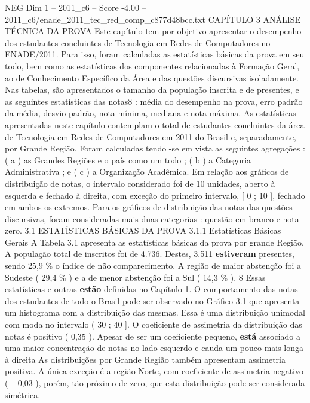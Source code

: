 \begin{textsample}{NEG Dim 1 – 2011\_c6 – Score -4.00 – 2011\_c6/enade\_2011\_tec\_red\_comp\_c877d48bcc.txt}  \label{ex:f1_neg_226}
CAPÍTULO 3 ANÁLISE TÉCNICA DA PROVA Este capítulo tem por objetivo apresentar o desempenho dos estudantes concluintes de Tecnologia em Redes de Computadores no ENADE/2011.
Para isso, foram calculadas as estatísticas básicas da prova em seu todo, bem como as estatísticas dos componentes relacionadas à Formação Geral, ao de Conhecimento Específico da Área e das questões discursivas isoladamente.
Nas tabelas, são apresentados o tamanho da população inscrita e de presentes, e as seguintes estatísticas das notas8 : média do desempenho na prova, erro padrão da média, desvio padrão, nota mínima, mediana e nota máxima.
As estatísticas apresentadas neste capítulo contemplam o total de estudantes concluintes da área de Tecnologia em Redes de Computadores em 2011 do Brasil e, separadamente, por Grande Região.
Foram calculadas tendo -se em vista as seguintes agregações : ( a ) as Grandes Regiões e o país como um todo ; ( b ) a Categoria Administrativa ; e ( c ) a Organização Acadêmica.
Em relação aos gráficos de distribuição de notas, o intervalo considerado foi de 10 unidades, aberto à esquerda e fechado à direita, com exceção do primeiro intervalo, [ 0 ; 10 ], fechado em ambos os extremos.
Para os gráficos de distribuição das notas das questões discursivas, foram consideradas mais duas categorias : questão em branco e nota zero. 3.1 ESTATÍSTICAS BÁSICAS DA PROVA 3.1.1 Estatísticas Básicas Gerais A Tabela 3.1 apresenta as estatísticas básicas da prova por grande Região.
A população total de inscritos foi de 4.736.
Destes, 3.511 \textbf{estiveram} presentes, sendo 25,9 \% o índice de não comparecimento.
A região de maior abstenção foi a Sudeste ( 29,4 \% ) e a de menor abstenção foi a Sul ( 14,3 \% ). 8 Essas estatísticas e outras \textbf{estão} definidas no Capítulo 1.
O comportamento das notas dos estudantes de todo o Brasil pode ser observado no Gráfico 3.1 que apresenta um histograma com a distribuição das mesmas.
Essa é uma distribuição unimodal com moda no intervalo ( 30 ; 40 ].
O coeficiente de assimetria da distribuição das notas é positivo ( 0,35 ).
Apesar de ser um coeficiente pequeno, \textbf{está} associado a uma maior concentração de notas no lado esquerdo e cauda um pouco mais longa à direita As distribuições por Grande Região também apresentam assimetria positiva.
A única exceção é a região Norte, com coeficiente de assimetria negativo ( – 0,03 ), porém, tão próximo de zero, que esta distribuição pode ser considerada simétrica.

\end{textsample}
